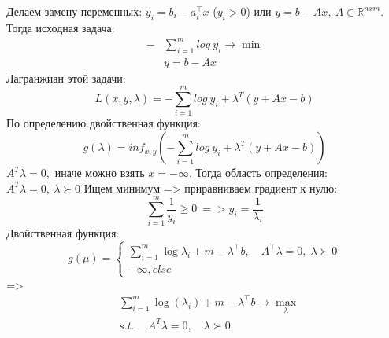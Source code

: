 \documentclass[12pt,letterpaper]{article}
\begin{document}
Делаем замену переменных: \(y_i = b_i-a^\top_i x\) ($y_i>0$) или $y=b-Ax,\ A\in\mathbb{R}^{nxm}.$ Тогда исходная задача:
$$\begin{aligned}
-&\sum^{m}_{i=1}log\ y_i\rightarrow \min\\
&y=b-Ax
\end{aligned} $$
Лагранжиан этой задачи:
$$L(x,y,\lambda)=-\sum^{m}_{i=1}log\ y_i+{\lambda}^T(y+Ax-b)$$
По определению двойственная функция:
$$g(\lambda)={inf}_{x,y}(-\sum^{m}_{i=1}log\ y_i+{\lambda}^T(y+Ax-b))$$
$A^T\lambda=0,$ иначе можно взять $x=-\infty$. Тогда область определения: $A^T\lambda=0,\ \lambda\succ0$ Ищем минимум => приравниваем градиент к нулю:
$$\sum^{m}_{i=1}\frac{1}{y_i}\geqslant0\ => y_i=\frac{1}{{\lambda}_i}$$
Двойственная функция:
$$g(\mu)=\left\{\begin{array}{l}
\sum\limits_{i=1}^{m} \log \lambda_{i}+m-\lambda^{\top} b, \quad A^{\top} \lambda=0, \; \lambda \succ 0  \\
-\infty, else
\end{array}\right.$$
=>
$$\begin{aligned}
&\sum\limits_{i=1}^{m} \log \left(\lambda_{i}\right)+m-\lambda^{\top} b \rightarrow \max\limits _{\lambda} \\
&s.t.\ \quad A^{T} \lambda=0, \quad \lambda \succ 0
\end{aligned}$$
\end{document}
